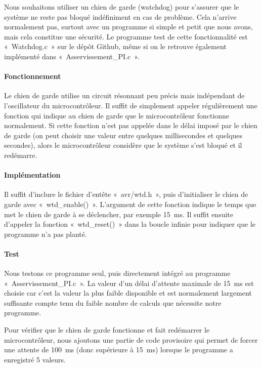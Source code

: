 \documentclass[12pt, a4paper, titlepage]{article}
\begin{document}
Nous souhaitons utiliser un chien de garde (watchdog) pour s'assurer que le système ne reste pas bloqué indéfiniment en cas de problème. Cela n'arrive normalement pas, surtout avec un programme si simple et petit que nous avons, mais cela constitue une sécurité. Le programme test de cette fonctionnalité est «~Watchdog.c~» sur le dépôt Github, même si on le retrouve également implémenté dans «~Asservissement\_PI.c~».

\paragraph{Fonctionnement}

Le chien de garde utilise un circuit résonnant peu précis mais indépendant de l'oscillateur du microcontrôleur. Il suffit de simplement appeler régulièrement une fonction qui indique au chien de garde que le microcontrôleur fonctionne normalement. Si cette fonction n'est pas appelée dans le délai imposé par le chien de garde (on peut choisir une valeur entre quelques millisecondes et quelques secondes), alors le microcontrôleur considère que le système s'est bloqué et il redémarre.

\paragraph{Implémentation}

Il suffit d'inclure le fichier d'entête «~avr/wtd.h~», puis d'initialiser le chien de garde avec «~wtd\_enable()~». L'argument de cette fonction indique le temps que met le chien de garde à se déclencher, par exemple \SI{15}{\milli\second}. Il suffit ensuite d'appeler la fonction «~wtd\_reset()~» dans la boucle infinie pour indiquer que le programme n'a pas planté.

\paragraph{Test}

Nous testons ce programme seul, puis directement intégré au programme «~Asservissement\_PI.c~». La valeur d'un délai d'attente maximale de \SI{15}{\milli\second} est choisie car c'est la valeur la plus faible disponible et est normalement largement suffisante compte tenu du faible nombre de calculs que nécessite notre programme.

Pour vérifier que le chien de garde fonctionne et fait redémarrer le microcontrôleur, nous ajoutons une partie de code provisoire qui permet de forcer une attente de \SI{100}{\milli\second} (donc supérieure à \SI{15}{\milli\second}) lorsque le programme a enregistré 5 valeurs.
\end{document}
